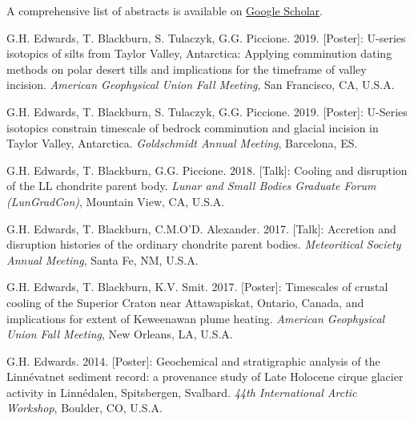 \documentclass[10pt]{res} %
\begin{document}
\begin{resume}
\vspace{4pt} %
\begin{center} A comprehensive list of abstracts is available on \href{https://scholar.google.com/citations?user=KHLOvgcAAAAJ&hl=en}{Google Scholar}. \end{center}
\begin{etaremune} [topsep=12pt, itemsep=4pt, itemindent= -12pt]
  \item G.H. Edwards, T. Blackburn, S. Tulaczyk, G.G. Piccione. 2019. [Poster]: U-series isotopics of silts from Taylor Valley, Antarctica: Applying comminution dating methods on polar desert tills and implications for the timeframe of valley incision. \emph{American Geophysical Union Fall Meeting}, San Francisco, CA, U.S.A.
  \item  G.H. Edwards, T. Blackburn, S. Tulaczyk, G.G. Piccione. 2019. [Poster]: U-Series isotopics constrain timescale of bedrock comminution and glacial incision in Taylor Valley, Antarctica. \emph{Goldschmidt Annual Meeting}, Barcelona, ES.
	\item  G.H. Edwards, T. Blackburn, G.G. Piccione. 2018. [Talk]: Cooling and disruption of the LL chondrite parent body. \emph{Lunar and Small Bodies Graduate Forum (LunGradCon)}, Mountain View, CA, U.S.A.
  \item  G.H. Edwards, T. Blackburn, C.M.O’D. Alexander. 2017. [Talk]: Accretion and disruption histories of the ordinary chondrite parent bodies. \emph{Meteoritical Society Annual Meeting}, Santa Fe, NM, U.S.A.
  \item G.H. Edwards, T. Blackburn, K.V. Smit. 2017. [Poster]: Timescales of crustal cooling of the Superior Craton near Attawapiskat, Ontario, Canada, and implications for extent of Keweenawan plume heating. \emph{American Geophysical Union Fall Meeting}, New Orleans, LA, U.S.A.
  \item G.H. Edwards. 2014. [Poster]: Geochemical and stratigraphic analysis of the Linnévatnet sediment record: a provenance study of Late Holocene cirque glacier activity in Linnédalen, Spitsbergen, Svalbard. \emph{44th International Arctic Workshop}, Boulder, CO, U.S.A.
\end{etaremune}
\vspace{-12pt}

\vspace{0.2cm} %


\end{resume}
\end{document}
